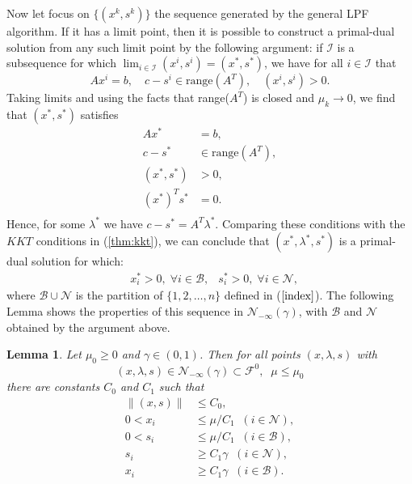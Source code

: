 \documentclass[a4paper,10 pt,titlepage,twoside]{book}
\theoremstyle{plain}
\newtheorem{lem}[thm]{Lemma}
\theoremstyle{definition}
\theoremstyle{remark}
\begin{document}
Now let focus on $\{(x^{k},s^{k})\}$ the sequence generated by the general LPF algorithm. If it has a limit point, then it is possible to construct a primal-dual solution from any such limit point by the following argument: if $\mathcal{I}$ is a subsequence for which $\lim_{i\in\mathcal{I}}(x^{i},s^{i})=(x^{*},s^{*})$, we have for all $i\in\mathcal{I}$ that
\begin{equation*}
Ax^{i}= b,\quad c - s^{i}\in \text{range}(A^{T}),\quad (x^{i},s^{i})>0.
\end{equation*}
Taking limits and using the facts that range($A^{T}$) is closed and $\mu_{k}\to 0$, we find that $(x^{*},s^{*})$ satisfies
\begin{align*}
Ax^{*}&= b,\\c-s^{*}&\in\text{range}(A^{T}),\\(x^{*},s^{*})&>0,\\(x^{*})^{T}s^{*}&=0.\\
\end{align*}
Hence, for some $\lambda^{*}$ we have $c-s^{*}= A^{T}\lambda^{*}$. Comparing these conditions with the $KKT$ conditions in (\ref{thm:kkt}), we can conclude that $(x^{*},\lambda^{*},s^{*})$ is a primal-dual solution for which:
\begin{align*}
&x^{*}_{i}>0,\; \forall i \in\mathcal{B},
&s^{*}_{i}>0,\; \forall i \in\mathcal{N},
\end{align*}
where $\mathcal{B}\cup\mathcal{N}$ is the partition of $\{1,2,\dots,n\}$ defined in ($\ref{index}$).
The following Lemma shows the properties of this sequence in $\mathcal{N}_{-\infty}(\gamma)$, with $\mathcal{B}$ and $\mathcal{N}$ obtained by the argument above.
\begin{lem}
	Let $\mu_{0}\geq 0$ and $\gamma\in(0,1)$. Then for all points $(x,\lambda,s)$ with
	\begin{equation*}
	(x,\lambda,s)\in\mathcal{N}_{-\infty}(\gamma)\subset\mathcal{F}^{0}, \;\; \mu \leq \mu_{0}
	\end{equation*}
	there are constants $C_{0}$ and $C_{1}$ such that
	\begin{align*}
	\lVert(x,s) \rVert&\leq C_{0},\tag{B}\label{B}\\0< x_{i}&\leq \mu/C_{1}\;\; (i \in\mathcal{N}),\\
	0< s_{i}&\leq \mu/C_{1}\;\; (i \in\mathcal{B}),\\ 
	s_{i}&\geq C_{1}\gamma \;\; (i \in\mathcal{N}),\\
	x_{i}&\geq C_{1}\gamma \;\; (i \in\mathcal{B}).\\
	\end{align*}
\end{lem}
\end{document}
